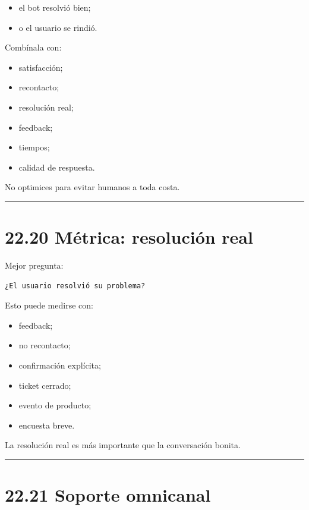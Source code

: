 \begin{itemize}
\tightlist
\item
  el bot resolvió bien;
\item
  o el usuario se rindió.
\end{itemize}

Combínala con:

\begin{itemize}
\tightlist
\item
  satisfacción;
\item
  recontacto;
\item
  resolución real;
\item
  feedback;
\item
  tiempos;
\item
  calidad de respuesta.
\end{itemize}

No optimices para evitar humanos a toda costa.

\begin{center}\rule{0.5\linewidth}{0.5pt}\end{center}

\section{22.20 Métrica: resolución
real}\label{muxe9trica-resoluciuxf3n-real}

Mejor pregunta:

\begin{lstlisting}
¿El usuario resolvió su problema?
\end{lstlisting}

Esto puede medirse con:

\begin{itemize}
\tightlist
\item
  feedback;
\item
  no recontacto;
\item
  confirmación explícita;
\item
  ticket cerrado;
\item
  evento de producto;
\item
  encuesta breve.
\end{itemize}

La resolución real es más importante que la conversación bonita.

\begin{center}\rule{0.5\linewidth}{0.5pt}\end{center}

\section{22.21 Soporte omnicanal}\label{soporte-omnicanal}

